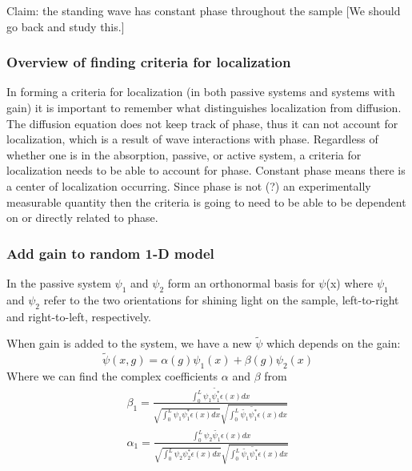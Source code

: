 Claim: the standing wave has constant phase throughout the sample %
[We should go back and study this.]

\subsubsection{Overview of finding criteria for localization}

In forming a criteria for localization (in both passive systems and systems with gain) it is important to remember what distinguishes localization from diffusion.  The diffusion equation does not keep track of phase, thus it can not account for localization, which is a result of wave interactions with phase.  Regardless of whether one is in the absorption, passive, or active system, a criteria for localization needs to be able to account for phase.  Constant phase means there is a center of localization occurring.  Since phase is not (?) an experimentally measurable quantity then the criteria is going to need to be able to be dependent on or directly related to phase.

\subsubsection{Add gain to random 1-D model}

In the passive system $ \psi _1 $ and $ \psi _2 $ form an orthonormal basis for $ \psi $(x) where $ \psi _1 $ and $ \psi _2 $ refer to the two orientations for shining light on the sample, left-to-right and right-to-left, respectively.

When gain is added to the system, we have a new $\tilde{\psi}$ which depends on the gain:
\begin{equation}
\tilde{\psi}(x,g) = \alpha(g)  \psi _1(x) + \beta(g)  \psi _2(x)
\end{equation}
Where we can find the complex coefficients
$\alpha$ and $\beta$ from
\begin{equation}  %
\begin{gathered}
\beta _1 = \frac{\int _0 ^L \psi _1 \tilde{\psi _1 ^*} \epsilon(x) dx}
{\sqrt{\int _0 ^L \psi _1 \psi _1 ^* \epsilon(x) dx}
 \sqrt{\int _0 ^L \tilde{\psi _1} \tilde{\psi _1 ^*} \epsilon(x) dx}} \\
\alpha _1 = \frac{\int _0 ^L \psi _2 \tilde{\psi _1} \epsilon(x) dx}
{\sqrt{\int _0 ^L \psi _2 \psi _2 ^* \epsilon(x) dx}
 \sqrt{\int _0 ^L \tilde{\psi _1} \tilde{\psi _1 ^*} \epsilon(x) dx}}
\end{gathered}
\end{equation}

